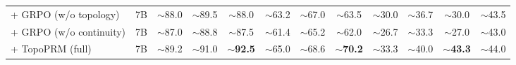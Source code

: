 \begin{table}[t]
{\begin{tabular}{l c ccc ccc ccc c}
+ GRPO (w/o topology)     & 7B & {$\sim$88.0} & {$\sim$89.5} & {$\sim$88.0} & {$\sim$63.2} & {$\sim$67.0} & {$\sim$63.5} & {$\sim$30.0} & {$\sim$36.7} & {$\sim$30.0} & {$\sim$43.5} \\
+ GRPO (w/o continuity)   & 7B & {$\sim$87.0} & {$\sim$88.8} & {$\sim$87.5} & {$\sim$61.4} & {$\sim$65.2} & {$\sim$62.0} & {$\sim$26.7} & {$\sim$33.3} & {$\sim$27.0} & {$\sim$43.0} \\
\rowcolor{blue!5}
+ TopoPRM (full)          & 7B & {$\sim$89.2} & {$\sim$91.0} & \textbf{{$\sim$92.5}} & {$\sim$65.0} & {$\sim$68.6} & \textbf{{$\sim$70.2}} & {$\sim$33.3} & {$\sim$40.0} & \textbf{{$\sim$43.3}} & {$\sim$44.0} \\
\bottomrule
\end{tabular}%
}
\end{table}
